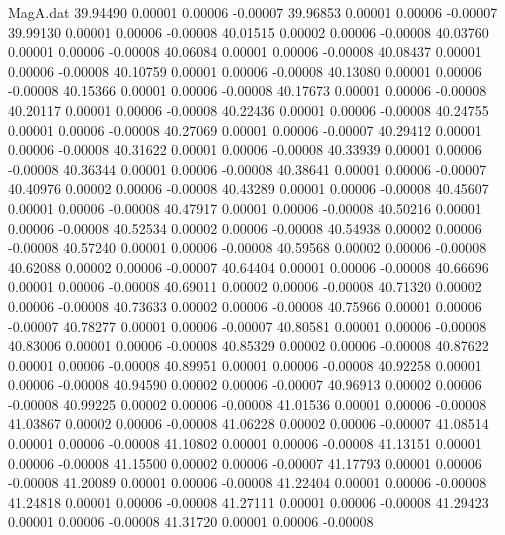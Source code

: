 \begin{filecontents}{MagA.dat}
  39.94490    0.00001    0.00006   -0.00007
  39.96853    0.00001    0.00006   -0.00007
  39.99130    0.00001    0.00006   -0.00008
  40.01515    0.00002    0.00006   -0.00008
  40.03760    0.00001    0.00006   -0.00008
  40.06084    0.00001    0.00006   -0.00008
  40.08437    0.00001    0.00006   -0.00008
  40.10759    0.00001    0.00006   -0.00008
  40.13080    0.00001    0.00006   -0.00008
  40.15366    0.00001    0.00006   -0.00008
  40.17673    0.00001    0.00006   -0.00008
  40.20117    0.00001    0.00006   -0.00008
  40.22436    0.00001    0.00006   -0.00008
  40.24755    0.00001    0.00006   -0.00008
  40.27069    0.00001    0.00006   -0.00007
  40.29412    0.00001    0.00006   -0.00008
  40.31622    0.00001    0.00006   -0.00008
  40.33939    0.00001    0.00006   -0.00008
  40.36344    0.00001    0.00006   -0.00008
  40.38641    0.00001    0.00006   -0.00007
  40.40976    0.00002    0.00006   -0.00008
  40.43289    0.00001    0.00006   -0.00008
  40.45607    0.00001    0.00006   -0.00008
  40.47917    0.00001    0.00006   -0.00008
  40.50216    0.00001    0.00006   -0.00008
  40.52534    0.00002    0.00006   -0.00008
  40.54938    0.00002    0.00006   -0.00008
  40.57240    0.00001    0.00006   -0.00008
  40.59568    0.00002    0.00006   -0.00008
  40.62088    0.00002    0.00006   -0.00007
  40.64404    0.00001    0.00006   -0.00008
  40.66696    0.00001    0.00006   -0.00008
  40.69011    0.00002    0.00006   -0.00008
  40.71320    0.00002    0.00006   -0.00008
  40.73633    0.00002    0.00006   -0.00008
  40.75966    0.00001    0.00006   -0.00007
  40.78277    0.00001    0.00006   -0.00007
  40.80581    0.00001    0.00006   -0.00008
  40.83006    0.00001    0.00006   -0.00008
  40.85329    0.00002    0.00006   -0.00008
  40.87622    0.00001    0.00006   -0.00008
  40.89951    0.00001    0.00006   -0.00008
  40.92258    0.00001    0.00006   -0.00008
  40.94590    0.00002    0.00006   -0.00007
  40.96913    0.00002    0.00006   -0.00008
  40.99225    0.00002    0.00006   -0.00008
  41.01536    0.00001    0.00006   -0.00008
  41.03867    0.00002    0.00006   -0.00008
  41.06228    0.00002    0.00006   -0.00007
  41.08514    0.00001    0.00006   -0.00008
  41.10802    0.00001    0.00006   -0.00008
  41.13151    0.00001    0.00006   -0.00008
  41.15500    0.00002    0.00006   -0.00007
  41.17793    0.00001    0.00006   -0.00008
  41.20089    0.00001    0.00006   -0.00008
  41.22404    0.00001    0.00006   -0.00008
  41.24818    0.00001    0.00006   -0.00008
  41.27111    0.00001    0.00006   -0.00008
  41.29423    0.00001    0.00006   -0.00008
  41.31720    0.00001    0.00006   -0.00008

\end{filecontents}
